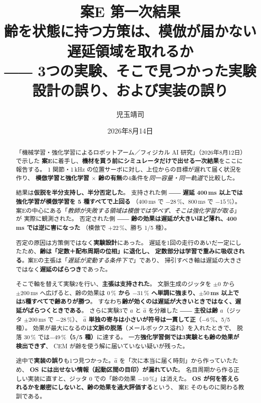 \documentclass[11pt,a4paper]{article}
\title{\vspace{-12mm}
  \Large 案E 第一次結果\\[2mm]
  \large 齢を状態に持つ方策は、模倣が届かない遅延領域を取れるか\\[1mm]
  \normalsize ―― 3つの実験、そこで見つかった実験設計の誤り、および実装の誤り\\[1mm]}
\author{\normalsize 児玉靖司}
\date{\normalsize 2026年8月14日}
\newcommand{\prob}[1]{\textbf{\textcolor{red!55!black}{#1}}}
\newcommand{\keyp}[1]{\textbf{\textcolor{blue!45!black}{#1}}}
\begin{document}
\maketitle
\vspace{-6mm}

\begin{abstract}
\noindent
「機械学習・強化学習によるロボットアーム／フィジカル AI 研究」（2026年8月12日）で示した
\keyp{案E}に着手し、\keyp{機材を買う前にシミュレータだけで出せる一次結果}をここに報告する。
1 関節・1\,kHz の位置サーボに対し、上位からの目標が遅れて届く状況を作り、
\keyp{模倣学習と強化学習 $\times$ 齢の有無}の4条件を\emph{同一容量・同一軌道}で比較した。

結果は\keyp{仮説を半分支持し、半分否定した}。
支持された側 ―― \keyp{遅延 400\,ms 以上では強化学習が模倣学習を 5 種すべてで上回る}
（400\,ms で $-28\,\%$、800\,ms で $-15\,\%$）。
案Eの中心にある「\emph{教師が失敗する領域は模倣では学べず、そこは強化学習が取る}」が
実際に観測された。
否定された側 ―― \prob{齢の効果は遅延が大きいほど薄れ、400\,ms では逆に害になった}
（模倣で $+22\,\%$、勝ち 1/5 種）。

否定の原因は方策側ではなく\prob{実験設計}にあった。
遅延を1回の走行のあいだ一定にしたため、\keyp{齢は「定数＋配布周期の位相」に退化し、
定数部分は学習で重みに吸収される}。案Eの主張は「\emph{遅延が変動する条件下で}」であり、
掃引すべき軸は遅延の大きさではなく\keyp{遅延のばらつき}であった。

そこで軸を替えて実験2を行い、\keyp{主張は支持された}。
文脈生成のジッタを $\pm 0$ から $\pm 200$\,ms へ広げると、齢の効果は
\keyp{$0\,\%$ から $-31\,\%$ へ単調に強まり、$\pm 50$\,ms 以上では5種すべてで齢ありが勝つ}。
すなわち\keyp{齢が効くのは遅延が大きいときではなく、遅延がばらつくときである}。
さらに実験3で $a$ と $\hat a$ を分離した ―― \keyp{主役は齢 $a$}（ジッタ $\pm 200$\,ms で $-28\,\%$）、
\keyp{$\hat a$ 単独の寄与は小さいが符号は一貫して正}（$-6\,\%$、5/5 種）。
効果が最大になるのは\keyp{文脈の脱落}（メールボックス溢れ）を入れたときで、
脱落 30\,\% では\keyp{$-49\,\%$（5/5 種）}に達する。
一方\prob{強化学習側では3実験とも齢の効果が検出できず}、
CEM が齢を使う解に届いていない疑いが残った。

途中で\prob{実装の誤り}も1つ見つかった。$\hat a$ を「次に本当に届く時刻」から作っていたため、
\prob{OS には出せない情報（起動区間の目印）が漏れていた}。
名目周期から作る正しい実装に直すと、ジッタ 0 での「齢の効果 $-10\,\%$」は消えた。
\keyp{OS が何を答えられるかを厳密にしないと、齢の効果を過大評価する}という、
案E そのものに関わる教訓である。
\end{abstract}
\end{document}
